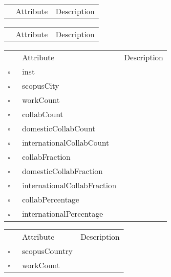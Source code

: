\clearpage
\begin{table}
\caption{Scenario  This class describes the dataset for the application. Typically there is a single instance of this class in the application at all times.}

\begin{longtable}{llp{8cm}}
& Attribute & Description \\
\end{longtable}
\label{attr:Scenario}
\end{table}

\begin{table}
\caption{School  }

\begin{longtable}{llp{8cm}}
& Attribute & Description \\
\end{longtable}
\label{attr:School}
\end{table}

\begin{table}
\caption{ScopusAffiliation  }

\begin{longtable}{llp{8cm}}
& Attribute & Description \\
$\square$\ & inst &  \\
$\square$\ & scopusCity &  \\
$\square$\ & workCount &  \\
$\square$\ & collabCount &  \\
$\square$\ & domesticCollabCount &  \\
$\square$\ & internationalCollabCount &  \\
$\square$\ & collabFraction &  \\
$\square$\ & domesticCollabFraction &  \\
$\square$\ & internationalCollabFraction &  \\
$\square$\ & collabPercentage &  \\
$\square$\ & internationalPercentage &  \\
\end{longtable}
\label{attr:ScopusAffiliation}
\end{table}

\begin{table}
\caption{ScopusCity  }

\begin{longtable}{llp{8cm}}
& Attribute & Description \\
$\square$\ & scopusCountry &  \\
$\square$\ & workCount &  \\
\end{longtable}
\label{attr:ScopusCity}
\end{table}

